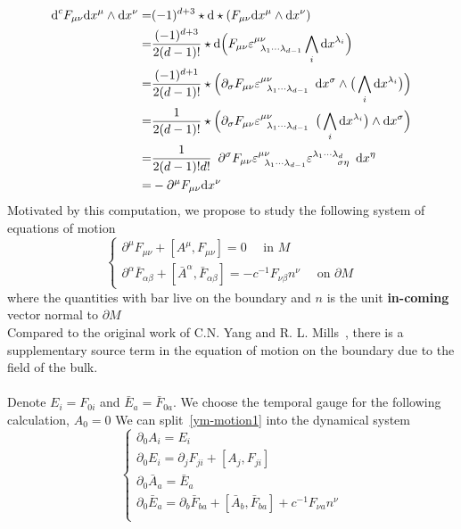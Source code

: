 \begin{equation*}
\begin{split}
\dd^c F_{\mu\nu} \dd x^\mu \wedge \dd x^\nu = & (-1)^{d+3} \star \dd \star (F_{\mu\nu} \dd x^\mu \wedge \dd x^\nu ) \\
%
= & \frac{(-1)^{d+3}}{2 (d-1)!} \star \dd \Big( F_{\mu\nu} \varepsilon^{\mu\nu}_{\enskip \lambda_1\cdots \lambda_{d-1}} \bigwedge_{i} \dd x^{\lambda_i} \Big) \\
%
= & \frac{(-1)^{d+1}}{2 (d-1)!} \star \Big( \partial_\sigma F_{\mu\nu} \varepsilon^{\mu\nu}_{\enskip \lambda_1\cdots \lambda_{d-1}} \enskip \dd x^\sigma\wedge \big(\bigwedge_{i} \dd x^{\lambda_i} \big)  \Big) \\
%
= & \frac{1}{2(d-1)!} \star \Big( \partial_\sigma F_{\mu\nu} \varepsilon^{\mu\nu}_{\enskip \lambda_1\cdots \lambda_{d-1}} \enskip \big(\bigwedge_{i} \dd x^{\lambda_i} \big) \wedge \dd x^\sigma \Big) \\
%
= & \frac{1}{2(d-1)!d !} \enskip  \partial^\sigma F_{\mu\nu} \varepsilon^{\mu\nu}_{\enskip \lambda_1\cdots \lambda_{d-1}} \varepsilon^{\lambda_1 \cdots\lambda_d}_{\enskip\enskip\enskip\enskip \sigma\eta} \enskip \dd x^\eta \\
%
= & - \partial^\mu F_{\mu\nu} \dd x^\nu
\end{split}
\end{equation*}
Motivated by this computation, we propose to study the following system of equations of motion
\begin{equation}\label{ym-motion1}
\begin{cases}
\partial^\mu F_{\mu\nu} +  [A^\mu, F_{\mu\nu}] = 0 \quad\textrm{ in $M$}\\
%
\partial^\alpha \bar F_{\alpha\beta} +  [\bar A^\alpha, \bar F_{\alpha\beta}] = 
 - c^{-1} F_{\nu\beta}n^\nu
\quad\textrm{ on $\partial M$}
\end{cases}
\end{equation}
where the quantities with bar live on the boundary and $n$ is the unit \textbf{in-coming} vector normal to $\partial M$\\
Compared to the original work of C.N. Yang and R. L. Mills~\cite{Yang1954}, there is a supplementary source term in the equation of motion on the boundary due to the field of the bulk.\\\\
Denote $E_i = F_{0i}$ and $\bar E_a = \bar F_{0a} $. 
We choose the temporal gauge for the following calculation, \ie $A_0 = 0$
We can split~\cref{ym-motion1} into the dynamical system 
\begin{equation}\label{ym-dyn}
\begin{cases}
\partial_0 A_i = E_i \\
\partial_0 E_i =  \partial_j F_{ji} + [A_j, F_{ji}] \\
\partial_0 \bar A_a = \bar E_a \\
\partial_0 \bar E_a =  \partial_b \bar F_{ba} +  [\bar A_b, \bar F_{ba}] + c^{-1} F_{\nu a} n^\nu \\
\end{cases}
\end{equation}
